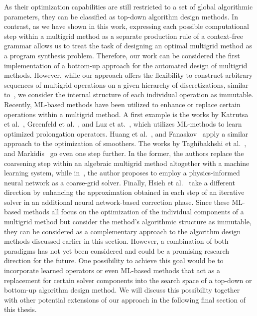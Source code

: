 As their optimization capabilities are still restricted to a set of global algorithmic parameters, they can be classified as top-down algorithm design methods.
In contrast, as we have shown in this work, expressing each possible computational step within a multigrid method as a separate production rule of a context-free grammar allows us to treat the task of designing an optimal multigrid method as a program synthesis problem.
Therefore, our work can be considered the first implementation of a bottom-up approach for the automated design of multigrid methods.
However, while our approach offers the flexibility to construct arbitrary sequences of multigrid operations on a given hierarchy of discretizations, similar to~\cite{oosterlee2003genetic,thekale2010optimizing,brown2021tuning}, we consider the internal structure of each individual operation as immutable.
Recently, ML-based methods have been utilized to enhance or replace certain operations within a multigrid method.
A first example is the works by Katrutsa et al.~\cite{katrutsa2020black}, Greenfeld et al.~\cite{greenfeld2019learning}, and Luz et at.~\cite{luz2020learning}, which utilizes ML-methods to learn optimized prolongation operators.
Huang et al.~\cite{huang2021learning}, and Fanaskov~\cite{fanaskov2021neural} apply a similar approach to the optimization of smoothers.
The works by Taghibakhshi et al.~\cite{taghibakhshi2021optimization}, and Markidis~\cite{markidis2021old} go even one step further.
In the former, the authors replace the coarsening step within an algebraic multigrid method altogether with a machine learning system, while in~\cite{markidis2021old}, the author proposes to employ a physics-informed neural network as a coarse-grid solver.
Finally, Hsieh et al.~\cite{hsieh2019learning} take a different direction by enhancing the approximation obtained in each step of an iterative solver in an additional neural network-based correction phase.
Since these ML-based methods all focus on the optimization of the individual components of a multigrid method but consider the method's algorithmic structure as immutable, they can be considered as a complementary approach to the algorithm design methods discussed earlier in this section.
However, a combination of both paradigms has not yet been considered and could be a promising research direction for the future.
One possibility to achieve this goal would be to incorporate learned operators or even ML-based methods that act as a replacement for certain solver components into the search space of a top-down or bottom-up algorithm design method.
We will discuss this possibility together with other potential extensions of our approach in the following final section of this thesis.
